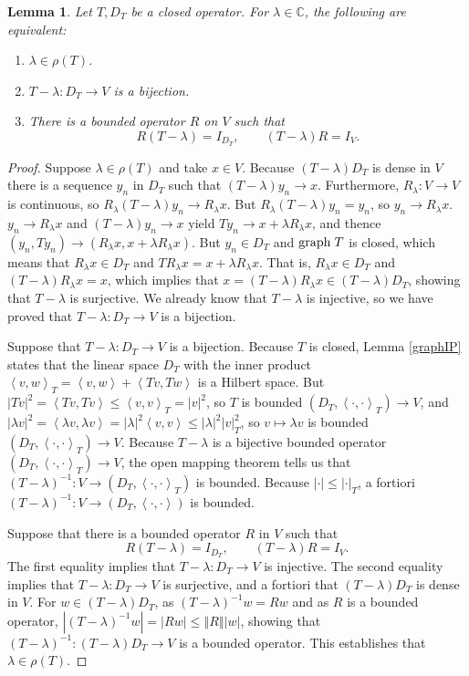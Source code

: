 \documentclass{article}
\newcommand{\inner}[2]{\left\langle #1, #2 \right\rangle}
\newcommand{\graph}{\ensuremath\mathrm{graph}\;}
\newcommand{\norm}[1]{\left\Vert #1 \right\Vert}
\newtheorem{lemma}[theorem]{Lemma}
\theoremstyle{definition}
\begin{document}
\begin{lemma}
Let $T,D_T$ be a closed operator. For $\lambda \in \mathbb{C}$, the following are equivalent:
\begin{enumerate}
\item $\lambda \in \rho(T)$.
\item $T-\lambda:D_T \to V$ is a bijection.
\item There is a bounded operator $R$ on $V$ such that
\[
R  (T-\lambda) = I_{D_T},\qquad (T-\lambda) R = I_V.
\]
\end{enumerate}
\end{lemma}
\begin{proof}
Suppose $\lambda \in \rho(T)$ and take $x \in V$. Because $(T-\lambda)D_T$ is dense in $V$ there
is a sequence $y_n$ in $D_T$ such that $(T-\lambda)y_n \to x$. Furthermore,
$R_\lambda:V \to V$ is continuous, so $R_\lambda(T-\lambda)y_n \to R_\lambda x$. But
$R_\lambda(T-\lambda)y_n=y_n$, so
$y_n \to R_\lambda x$. $y_n \to R_\lambda x$ and $(T-\lambda)y_n \to x$ yield
$Ty_n \to x+\lambda R_\lambda x$, and thence
$(y_n,Ty_n) \to (R_\lambda x,x+ \lambda R_\lambda x)$. But
$y_n \in D_T$ and $\graph T$ is closed, which means that
$R_\lambda x \in D_T$ and 
$T R_\lambda x = x+\lambda R_\lambda x$. That is, 
$R_\lambda x \in D_T$ and $(T-\lambda)R_\lambda x = x$, which implies that
$x=(T-\lambda) R_\lambda x \in (T-\lambda)D_T$, showing that $T-\lambda$ is surjective. We already
know that $T-\lambda$ is injective, so we have proved that $T-\lambda:D_T \to V$ is a bijection.

Suppose that $T-\lambda:D_T \to V$ is a bijection. Because $T$ is closed, Lemma \ref{graphIP} states
that the linear space $D_T$
with the inner product $\inner{v}{w}_T = \inner{v}{w}+\inner{Tv}{Tw}$ is a Hilbert space. 
But $|Tv|^2 = \inner{Tv}{Tv} \leq \inner{v}{v}_T = |v|^2$, so $T$ is bounded $(D_T,\inner{\cdot}{\cdot}_T) \to V$,
and $|\lambda v|^2 = \inner{\lambda v}{\lambda v}
=|\lambda|^2 \inner{v}{v} \leq |\lambda|^2 |v|_T^2$, so $v \mapsto \lambda v$ is bounded $(D_T,\inner{\cdot}{\cdot}_T) \to V$.
Because $T-\lambda$ is a bijective bounded operator
$(D_T,\inner{\cdot}{\cdot}_T) \to V$, the open mapping theorem tells us that
$(T-\lambda)^{-1}:V \to (D_T,\inner{\cdot}{\cdot}_T)$ is bounded.
Because $|\cdot| \leq |\cdot|_T$, a fortiori
$(T-\lambda)^{-1}:V \to (D_T,\inner{\cdot}{\cdot})$ is bounded. 

Suppose that there is a bounded operator $R$ in $V$ such that 
\[
R  (T-\lambda) = I_{D_T},\qquad (T-\lambda) R = I_V.
\]
The first equality implies that $T-\lambda:D_T \to V$ is injective. The second equality implies that $T-\lambda:D_T \to V$
is surjective, and a fortiori that $(T-\lambda)D_T$ is dense in $V$. 
For $w \in (T-\lambda)D_T$, as $(T-\lambda)^{-1}w = Rw$ and
as
$R$ is a bounded operator,  $|(T-\lambda)^{-1}w| = |Rw| \leq \norm{R} |w|$,
showing that $(T-\lambda)^{-1}:(T-\lambda)D_T \to V$ is a bounded operator. This establishes that $\lambda \in \rho(T)$.
\end{proof}
\end{document}
